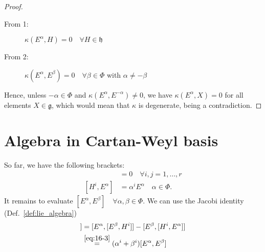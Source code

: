 \begin{proof}
  \begin{description}
    \item[From 1:] $\kappa(E^{\alpha}, H) = 0 \quad \forall H \in \mathfrak{h}$
    \item[From 2:] $\kappa(E^{\alpha}, E^{\beta}) = 0 \quad \forall \beta \in \Phi$ with $\alpha \neq -\beta$
  \end{description}
  Hence, unless $-\alpha \in \Phi$ and $\kappa(E^{\alpha}, E^{-\alpha}) \neq 0$, we have $\kappa(E^{\alpha}, X) = 0$ for all elements $X \in \mathfrak{g}$, which would mean that $\kappa$ is degenerate, being a contradiction.
\end{proof}

\section{Algebra in Cartan-Weyl basis}%
\label{sec:algebra_in_cartan_weyl_basis}

So far, we have the following brackets:
\begin{align}
  [H^{i}, H^{j}] &= 0 \quad \forall i , j = 1, \dots, r \\
  [H^{i}, E^{\alpha}] &= \alpha^{i} E^{\alpha} \quad \alpha \in \Phi.
\end{align}
It remains to evaluate $[E^{\alpha}, E^{\beta}] \quad \forall \alpha, \beta \in \Phi$.
We can use the Jacobi identity (Def.~\ref{def:lie_algebra})
\begin{align}
[H^{i}, [E^{\alpha}, E^{\beta}]] &= [E^{\alpha}, [E^{\beta}, H^{i}]] - [E^{\beta}, [H^{i}, E^{\alpha}]] \\
				   &\stackrel{\eqref{eq:16-3}}{=} (\alpha^{i} + \beta^{i}) [E^{\alpha}, E^{\beta}]
\end{align}
